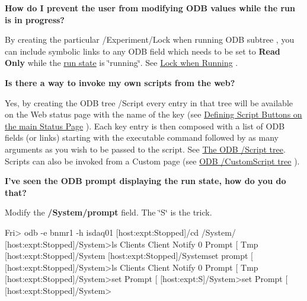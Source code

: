 \begin{DoxyEnumerate}
\item {\bfseries  How do I prevent the user from modifying ODB values while the run is in progress?}
\begin{DoxyItemize}
\item By creating the particular /Experiment/Lock when running ODB subtree , you can include symbolic links to any ODB field which needs to be set to {\bfseries Read Only} while the \hyperlink{RC_Run_States_and_Transitions}{run state} is \char`\"{}running\char`\"{}. See \hyperlink{RC_customize_ODB_RC_Lock_when_Running}{Lock when Running} . \par
\par

\end{DoxyItemize}


\item {\bfseries  Is there a way to invoke my own scripts from the web?}
\begin{DoxyItemize}
\item Yes, by creating the ODB tree  /Script every entry in that tree will be available on the Web status page with the name of the key (see \hyperlink{RC_mhttpd_defining_script_buttons}{Defining Script Buttons on the main Status Page} ). Each key entry is then composed with a list of ODB fields (or links) starting with the executable command followed by as many arguments as you wish to be passed to the script. See \hyperlink{RC_mhttpd_defining_script_buttons_RC_odb_script_tree}{The ODB /Script tree}. Scripts can also be invoked from a Custom page (see \hyperlink{RC_mhttpd_custom_features_RC_odb_customscript_tree}{ODB /CustomScript tree} ). \par
\par
 
\end{DoxyItemize}
\item {\bfseries  I've seen the ODB prompt displaying the run state, how do you do that?}
\begin{DoxyItemize}
\item Modify the {\bfseries /System/prompt} field. The \char`\"{}S\char`\"{} is the trick. 
\begin{DoxyCode}
 Fri> odb -e bnmr1 -h isdaq01
 [host:expt:Stopped]/cd /System/
 [host:expt:Stopped]/System>ls
 Clients
 Client Notify                   0
 Prompt                          [%
 Tmp
 [host:expt:Stopped]/System
 [host:expt:Stopped]/Systemset prompt [%
 [host:expt:Stopped]/System>ls
 Clients
 Client Notify                   0
 Prompt                          [%
 Tmp
 [host:expt:Stopped]/System>set Prompt [%
 [host:expt:S]/System>set Prompt [%
 [host:expt:Stopped]/System>     
\end{DoxyCode}
 \par
\par
 

\end{DoxyItemize}
\end{DoxyEnumerate}
